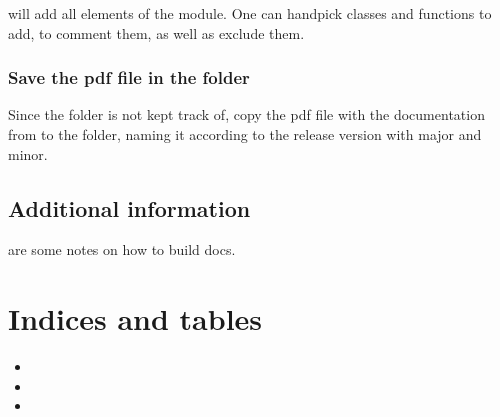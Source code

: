 \documentclass[letterpaper,10pt,english]{sphinxmanual}
\begin{document}
will add all elements of the  module. One can hand\sphinxhyphen{}pick
classes and functions to add, to comment them, as well as exclude them.


\subsection{Save the pdf file in the  folder}
\label{\detokenize{README-docs:save-the-pdf-file-in-the-docs-pdf-folder}}
Since the  folder is not kept track of, copy the pdf file
with the documentation from  to the  folder,
naming it according to the release version with major and minor.


\section{Additional information}
\label{\detokenize{README-docs:additional-information}}
are some notes on how to build docs.


\chapter{Indices and tables}
\label{\detokenize{index:indices-and-tables}}\begin{itemize}
\item {} 

\item {} 

\item {} 

\end{itemize}


\renewcommand{\indexname}{Python Module Index}
\begin{sphinxtheindex}
\let\bigletter\sphinxstyleindexlettergroup
\bigletter{m}
\item\relax{}
\item\relax{}
\item\relax{}
\item\relax{}
\item\relax{}
\item\relax{}
\end{sphinxtheindex}

\renewcommand{\indexname}{Index}
\printindex
\end{document}
